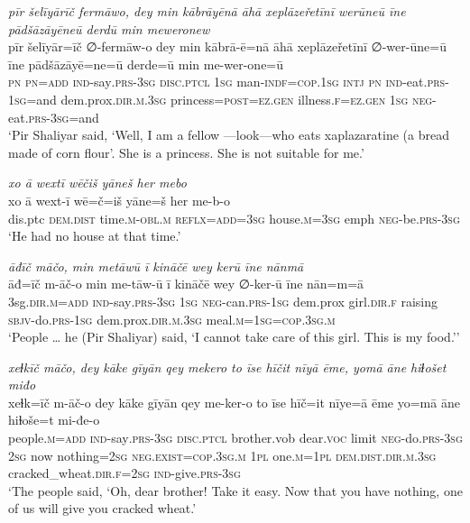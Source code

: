 \ea \label{ŽP.210}
\textit{pīr šelīyārīč fermāwo, dey min kābrāyēnā āhā xeplāzeřetīnī werūneū īne pādšāzāyēneū derdū min meweronew} \\ 
\gll pīr šelīyār=īč ∅-fermāw-o dey min kābrā-ē=nā āhā xeplāzeřetīnī ∅-wer-ūne=ū īne pādšāzāyē=ne=ū derde=ū min me-wer-one=ū \\ 
 \textsc{pn} \textsc{pn}\textsc{=add} \textsc{ind-}say\textsc{.prs}\textsc{-3sg} \textsc{disc.ptcl} \textsc{1sg} man\textsc{-indf}\textsc{=cop}\textsc{.\textsc{1sg}} \textsc{intj} \textsc{pn} \textsc{ind-}eat\textsc{.prs}\textsc{-\textsc{1sg}}=and dem.prox\textsc{.dir}\textsc{.m}\textsc{.3sg} princess\textsc{=\textsc{post}}\textsc{\textsc{=ez.gen}} illness\textsc{.f}\textsc{\textsc{=ez.gen}} \textsc{1sg} \textsc{neg-}eat\textsc{.prs}\textsc{-3sg}=and \\ 
\glt `Pir Shaliyar said, ‘Well, I am a fellow —look—who eats xaplazaratine (a bread made of corn flour’. She is a princess. She is not suitable for me.'
\z 
 
\ea \label{ŽP.219}
\textit{xo ā wextī wēčiš yāneš her mebo} \\ 
\gll xo ā wext-ī wē=č=iš yāne=š her me-b-o \\ 
 dis.ptc \textsc{dem.dist} time\textsc{.m}\textsc{-obl}\textsc{.m} \textsc{reflx}\textsc{=add}\textsc{=3sg} house\textsc{.m}\textsc{=3sg} emph \textsc{neg-}be\textsc{.prs}\textsc{-3sg} \\ 
\glt `He had no house at that time.'
\z 
 
\ea \label{ŽP.226}
\textit{āđīč māčo, min metāwū ī kināčē wey kerū īne nānmā} \\ 
\gll āđ=īč m-āč-o min me-tāw-ū ī kināčē wey ∅-ker-ū īne nān=m=ā \\ 
 3sg\textsc{.dir}\textsc{.m}\textsc{=add} \textsc{ind-}say\textsc{.prs}\textsc{-3sg} \textsc{1sg} \textsc{neg-}can\textsc{.prs}\textsc{-\textsc{1sg}} dem.prox girl\textsc{.dir}\textsc{.f} raising \textsc{sbjv-}do\textsc{.prs}\textsc{-\textsc{1sg}} dem.prox\textsc{.dir}\textsc{.m}\textsc{.3sg} meal\textsc{.m}\textsc{=\textsc{1sg}}\textsc{=cop}\textsc{.3sg}\textsc{.m} \\ 
\glt `People … he (Pir Shaliyar) said, ‘I cannot take care of this girl. This is my food.’'
\z 
 
\ea \label{ŽP.227}
\textit{xeɫkīč māčo, dey kāke gīyān qey mekero to īse hīčit nīyā ēme, yomā āne hiɫošet miđo} \\ 
\gll xeɫk=īč m-āč-o dey kāke gīyān qey me-ker-o to īse hīč=it nīye=ā ēme yo=mā āne hiɫoše=t mi-đe-o \\ 
 people\textsc{.m}\textsc{=add} \textsc{ind-}say\textsc{.prs}\textsc{-3sg} \textsc{disc.ptcl} brother.vob dear.\textsc{voc} limit \textsc{neg-}do\textsc{.prs}\textsc{-3sg} \textsc{2sg} now nothing\textsc{=\textsc{2sg}} \textsc{\textsc{neg.}exist}\textsc{=cop}\textsc{.3sg}\textsc{.m} \textsc{1pl} one\textsc{.m}\textsc{=1pl} \textsc{dem.dist}\textsc{.dir}\textsc{.m}\textsc{.3sg} cracked\_wheat\textsc{.dir}\textsc{.f}\textsc{=\textsc{2sg}} \textsc{ind-}give\textsc{.prs}\textsc{-3sg} \\ 
\glt `The people said, ‘Oh, dear brother! Take it easy. Now that you have nothing, one of us will give you cracked wheat.'
\z 
 
